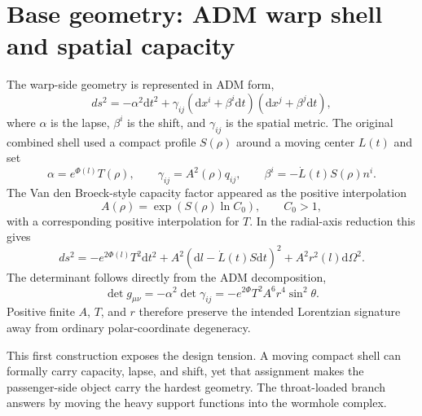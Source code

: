 \documentclass[11pt]{article}
\newcommand{\dd}{\mathrm{d}}
\begin{document}
\section{Base geometry: ADM warp shell and spatial capacity}
The warp-side geometry is represented in ADM form,
\begin{equation}
 ds^2=-\alpha^2\dd t^2+
 \gamma_{ij}\left(\dd x^i+\beta^i\dd t\right)
 \left(\dd x^j+\beta^j\dd t\right),
\end{equation}
where $\alpha$ is the lapse, $\beta^i$ is the shift, and $\gamma_{ij}$ is the spatial metric.  The original combined shell used a compact profile $S(\rho)$ around a moving center $L(t)$ and set
\begin{equation}
 \alpha=e^{\Phi(l)}T(\rho),
 \qquad
 \gamma_{ij}=A^2(\rho)q_{ij},
 \qquad
 \beta^i=-\dot L(t)S(\rho)n^i.
\end{equation}
The Van den Broeck-style capacity factor appeared as the positive interpolation
\begin{equation}
 A(\rho)=\exp\!\left(S(\rho)\ln C_0\right),\qquad C_0>1,
\end{equation}
with a corresponding positive interpolation for $T$.  In the radial-axis reduction this gives
\begin{equation}
 ds^2=-e^{2\Phi(l)}T^2\dd t^2
 +A^2\left(\dd l-\dot L(t)S\dd t\right)^2
 +A^2r^2(l)\dd\Omega^2.
\end{equation}
The determinant follows directly from the ADM decomposition,
\begin{equation}
 \det g_{\mu\nu}=-\alpha^2\det\gamma_{ij}
 =-e^{2\Phi}T^2A^6r^4\sin^2\theta.
\end{equation}
Positive finite $A$, $T$, and $r$ therefore preserve the intended Lorentzian signature away from ordinary polar-coordinate degeneracy.

This first construction exposes the design tension.  A moving compact shell can formally carry capacity, lapse, and shift, yet that assignment makes the passenger-side object carry the hardest geometry.  The throat-loaded branch answers by moving the heavy support functions into the wormhole complex.
\end{document}
